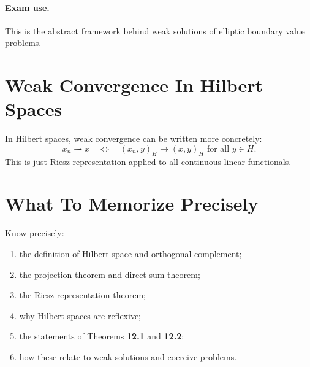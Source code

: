 \documentclass[11pt]{article}
\begin{document}
\paragraph{Exam use.}
This is the abstract framework behind weak solutions of elliptic boundary value problems.

\section{Weak Convergence In Hilbert Spaces}

\begin{focusbox}
In Hilbert spaces, weak convergence can be written more concretely:
\[
x_n\rightharpoonup x \quad \Longleftrightarrow \quad (x_n,y)_H\to (x,y)_H \text{ for all } y\in H.
\]
This is just Riesz representation applied to all continuous linear functionals.
\end{focusbox}

\section{What To Memorize Precisely}

\begin{focusbox}
Know precisely:
\begin{enumerate}
\item the definition of Hilbert space and orthogonal complement;
\item the projection theorem and direct sum theorem;
\item the Riesz representation theorem;
\item why Hilbert spaces are reflexive;
\item the statements of Theorems \textbf{12.1} and \textbf{12.2};
\item how these relate to weak solutions and coercive problems.
\end{enumerate}
\end{focusbox}
\end{document}
